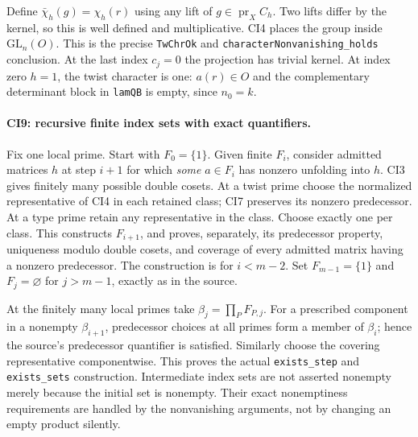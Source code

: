 Define $\bar\chi_h(g)=\chi_h(r)$ using any lift of
$g\in\operatorname{pr}_X C_h$. Two lifts differ by the kernel,
so this is well defined and multiplicative. CI4 places the group
inside $\mathrm{GL}_n(O)$. This is the precise \texttt{TwChrOk}
and \texttt{characterNonvanishing\_holds} conclusion. At the last
index $c_j=0$ the projection has trivial kernel. At index zero
$h=1$, the twist character is one: $a(r)\in O$ and the
complementary determinant block in \texttt{lamQB} is empty,
since $n_0=k$.

\paragraph{CI9: recursive finite index sets with exact quantifiers.}
Fix one local prime. Start with $F_0=\{1\}$. Given finite $F_i$,
consider admitted matrices $h$ at step $i+1$ for which
\emph{some} $a\in F_i$ has nonzero unfolding into $h$. CI3 gives
finitely many possible double cosets. At a twist prime choose
the normalized representative of CI4 in each retained class;
CI7 preserves its nonzero predecessor. At a type prime retain
any representative in the class. Choose exactly one per class.
This constructs $F_{i+1}$, and proves, separately, its predecessor
property, uniqueness modulo double cosets, and coverage of every
admitted matrix having a nonzero predecessor. The construction
is for $i<m-2$. Set $F_{m-1}=\{1\}$ and $F_j=\varnothing$ for
$j>m-1$, exactly as in the source.

At the finitely many local primes take
$\beta_j=\prod_P F_{P,j}$. For a prescribed component in a
nonempty $\beta_{i+1}$, predecessor choices at all primes form a
member of $\beta_i$; hence the source's predecessor quantifier
is satisfied. Similarly choose the covering representative
componentwise. This proves the actual \texttt{exists\_step} and
\texttt{exists\_sets} construction. Intermediate index sets are
not asserted nonempty merely because the initial set is nonempty.
Their exact nonemptiness requirements are handled by the
nonvanishing arguments, not by changing an empty product silently.

